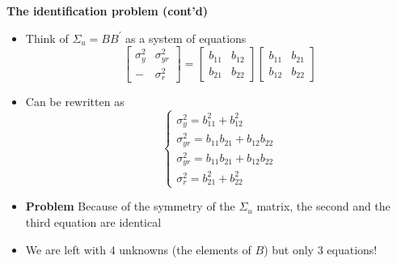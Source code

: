 \documentclass[10pt,english,t,aspectratio=169,ignorenonframetext]{beamer}
\begin{document}

\begin{frame}
{\textbf{The identification problem (cont'd)}}\vspace{-.15cm}

\begin{itemize}
\item Think of $\Sigma _{u}=BB^{\prime }$ as a system of equations 
\begin{equation*}
\left[ 
\begin{array}{cc}
\sigma _{y}^{2} & \sigma _{yr}^{2} \\ 
- & \sigma _{r}^{2}%
\end{array}%
\right] =\left[ 
\begin{array}{cc}
b_{11} & b_{12} \\ 
b_{21} & b_{22}%
\end{array}%
\right] \left[ 
\begin{array}{cc}
b_{11} & b_{21} \\ 
b_{12} & b_{22}%
\end{array}%
\right]
\end{equation*}

\item Can be rewritten as%
\begin{equation*}
\left\{ 
\begin{array}{l}
\sigma _{y}^{2}=b_{11}^{2}+b_{12}^{2} \\ 
\sigma _{yr}^{2}=b_{11}b_{21}+b_{12}b_{22} \\ 
\sigma _{yr}^{2}=b_{11}b_{21}+b_{12}b_{22} \\ 
\sigma _{r}^{2}=b_{21}^{2}+b_{22}^{2}%
\end{array}%
\right.
\end{equation*}
\pause

\item \textbf{Problem} Because of the symmetry of the $\Sigma _{u}$ matrix,
the second and the third equation are identical\bigskip

\item We are left with $4$ unknowns (the elements of $B$) but only $3$
equations!
\end{itemize}
\end{frame}

\end{document}
